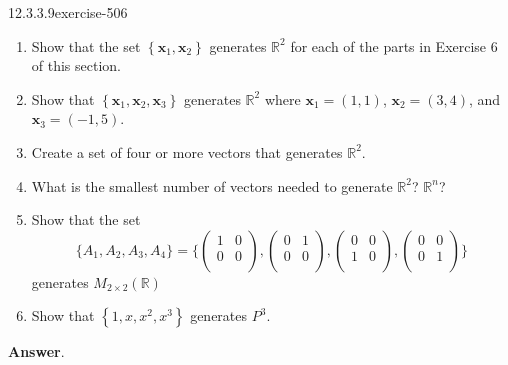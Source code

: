 \documentclass[twoside,10pt,]{book}
\numberwithin{equation}{section}
\renewcommand{\vec}[1]{\mathbf{#1}}
\begin{document}
\begin{divisionsolution}{12.3.3.9}{}{exercise-506}%
\hypertarget{p-4536}{}%
\leavevmode%
\begin{enumerate}[label=(\alph*)]
\item\hypertarget{li-2075}{}\hypertarget{p-4537}{}%
Show that the set \(\left\{\vec{x}_1,\vec{x}_2\right\}\) generates \(\mathbb{R}^2\) for each of the parts in Exercise 6 of this section.%
\item\hypertarget{li-2076}{}\hypertarget{p-4538}{}%
Show that \(\left\{\vec{x}_1,\vec{x}_2,\vec{x}_3\right\}\) generates \(\mathbb{R}^2\) where \(\vec{x}_1= (1, 1)\), \(\vec{x}_2= (3,4)\), and \(\vec{x}_3 = (-1, 5)\).%
\item\hypertarget{li-2077}{}\hypertarget{p-4539}{}%
Create a set of four or more vectors that generates \(\mathbb{R}^2\).%
\item\hypertarget{li-2078}{}\hypertarget{p-4540}{}%
What is the smallest number of vectors needed to generate \(\mathbb{R}^2\)?   \(\mathbb{R}^n\)?%
\item\hypertarget{li-2079}{}\hypertarget{p-4541}{}%
Show that the set%
\begin{equation*}
\{A_1, A_2 ,A_3, A_4\} =\{
\left(
\begin{array}{cc}
1 & 0 \\
0 & 0 \\
\end{array}
\right),
\left(
\begin{array}{cc}
0 & 1 \\
0 & 0 \\
\end{array}
\right),
\left(
\begin{array}{cc}
0 & 0 \\
1 & 0 \\
\end{array}
\right),
\left(
\begin{array}{cc}
0 & 0 \\
0 & 1 \\
\end{array}
\right)\}
\end{equation*}
generates \(M_{2\times 2}(\mathbb{R})\)%
\item\hypertarget{li-2080}{}\hypertarget{p-4542}{}%
Show that \(\left\{1,x,x^2 ,x^3\right\}\) generates \(P^3\).%
\end{enumerate}
%
\par\smallskip%
\noindent\textbf{Answer}.\quad%
\hypertarget{p-4543}{}%
\leavevmode%
\begin{enumerate}[label=(\alph*)]

\end{enumerate}
\end{divisionsolution}
\end{document}
